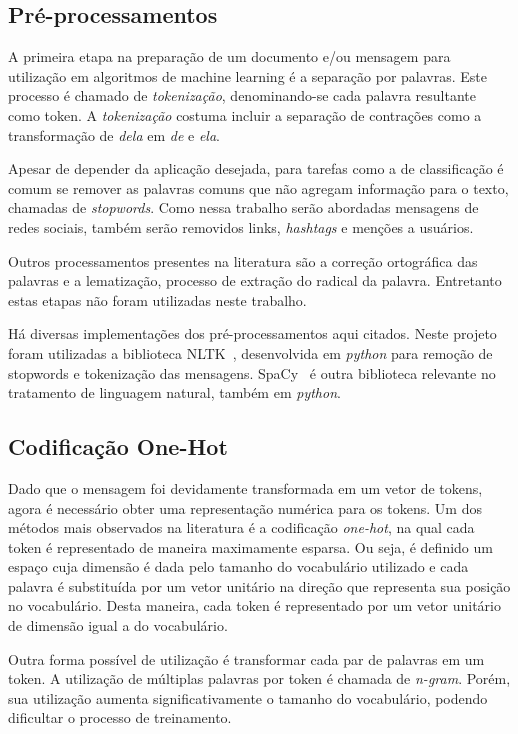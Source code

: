 
\subsection{Pré-processamentos}

A primeira etapa na preparação de um documento e/ou mensagem para utilização em algoritmos de machine learning é a
separação por palavras.
Este processo é chamado de \textit{tokenização}, denominando-se cada palavra resultante como token.
A \textit{tokenização} costuma incluir a separação de contrações como a transformação de \textit{dela} em \textit{de}
e \textit{ela}.

Apesar de depender da aplicação desejada, para tarefas como a de classificação é comum se remover as palavras comuns que
não agregam informação para o texto, chamadas de \textit{stopwords}.
Como nessa trabalho serão abordadas mensagens de redes sociais, também serão removidos links, \textit{hashtags} e menções
a usuários.

Outros processamentos presentes na literatura são a correção ortográfica das palavras e a lematização, processo de
extração do radical da palavra.
Entretanto estas etapas não foram utilizadas neste trabalho.

Há diversas implementações dos pré-processamentos aqui citados. Neste projeto foram utilizadas a biblioteca
NLTK~\cite{nltk}, desenvolvida em \textit{python} para remoção de stopwords e tokenização das mensagens.
SpaCy~\cite{spacy} é outra biblioteca relevante no tratamento de linguagem natural, também em \textit{python}.

\subsection{Codificação One-Hot}

Dado que o mensagem foi devidamente transformada em um vetor de tokens, agora é necessário obter uma representação
numérica para os tokens.
Um dos métodos mais observados na literatura é a codificação \textit{one-hot}, na qual cada token é representado de
maneira maximamente esparsa.
Ou seja, é definido um espaço cuja dimensão é dada pelo tamanho do vocabulário utilizado e cada palavra é substituída
por um vetor unitário na direção que representa sua posição no vocabulário.
Desta maneira, cada token é representado por um vetor unitário de dimensão igual a do vocabulário.

Outra forma possível de utilização é transformar cada par de palavras em um token.
A utilização de múltiplas palavras por token é chamada de \textit{n-gram}.
Porém, sua utilização aumenta significativamente o tamanho do vocabulário, podendo dificultar o processo de treinamento.

